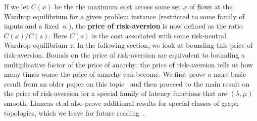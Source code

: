 If we let $C(x)$ be the the maximum cost across some set $x$ of flows at the Wardrop equilibrium for a given problem instance 
(restricted to some family of inputs and a fixed $\upkappa$), the {\textbf{price of risk-aversion}} is now defined as the
ratio $C(x)/C(z)$. Here $C(z)$ is the cost associated with some risk-neutral Wardrop equilibrium $z$. 
In the following section, we look at bounding this price of risk-aversion. 
Bounds on the price of risk-aversion are equivalent to bounding 
a multiplicative factor of the price of anarchy: the price of risk-aversion tells us how many times worse 
the price of anarchy can become.
We first prove a 
more basic result from an older paper on this topic~\cite{risk-averse-background} and then proceed to the main result on the price
of risk-aversion for 
a special family of latency functions that are $(\lambda, \mu)$ smooth. Lianeas et.al also prove additional results for special classes
of graph topologies, which we leave for future reading~\cite{risk-averse}.



